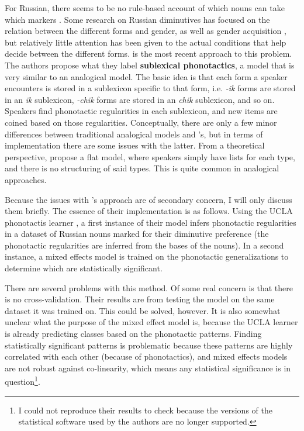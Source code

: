 For Russian, there seems to be no rule-based account of which nouns can take which markers \autocite{Gouskova.2015}. Some research on Russian diminutives has focused on the relation between the different forms and gender, as well as gender acquisition \autocites{Kempe.2010, Protassova.2007, Voeykova.1998}, but relatively little attention has been given to the actual conditions that help decide between the different forms. \textcite{Gouskova.2015} is the most recent approach to this problem. The authors propose what they label \textbf{sublexical phonotactics}, a model that is very similar to an analogical model. The basic idea is that each form a speaker encounters is stored in a sublexicon specific to that form, i.e. \textit{-ik} forms are stored in an \textit{ik} sublexicon, \textit{-chik} forms are stored in an \textit{chik} sublexicon, and so on. Speakers find phonotactic regularities in each sublexicon, and new items are coined based on those regularities. Conceptually, there are only a few minor differences between traditional analogical models and \textcite{Gouskova.2015}'s, but in terms of implementation there are some issues with the latter. From a theoretical perspective, \textcite{Gouskova.2015} propose a flat model, where speakers simply have lists for each type, and there is no structuring of said types. This is quite common in analogical approaches. %

Because the issues with \textcite{Gouskova.2015}'s approach are of secondary concern, I will only discuss them briefly. The essence of their implementation is as follows. Using the UCLA phonotactis learner \autocite{Hayes.2008}, a first instance of their model infers phonotactic regularities in a dataset of Russian nouns marked for their diminutive preference (the phonotactic regularities are inferred from the bases of the nouns). In a second instance, a mixed effects model is trained on the phonotactic generalizations to determine which are statistically significant.

There are several problems with this method. Of some real concern is that there is no cross-validation. Their results are from testing the model on the same dataset it was trained on. This could be solved, however. It is also somewhat unclear what the purpose of the mixed effect model is, because the UCLA learner is already predicting classes based on the phonotactic patterns. Finding statistically significant patterns is problematic because these patterns are highly correlated with each other (because of phonotactics), and mixed effects models are not robust against co-linearity, which means any statistical significance is in question\footnote{I could not reproduce their results to check because the versions of the statistical software used by the authors are no longer supported.}.

